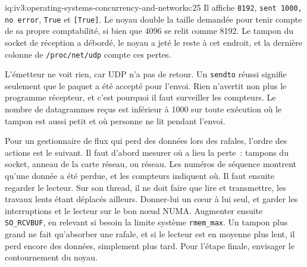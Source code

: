 \begin{solution}{iq:iv3:operating-systems-concurrency-and-networks:25}
Il affiche \texttt{8192}, \texttt{sent 1000, no error}, \texttt{True} et \texttt{[True]}. Le noyau double la taille demandée pour tenir compte de sa propre comptabilité, si bien que 4096 se relit comme 8192. Le tampon du socket de réception a débordé, le noyau a jeté le reste à cet endroit, et la dernière colonne de \texttt{/proc/net/udp} compte ces pertes.

L'émetteur ne voit rien, car UDP n'a pas de retour. Un \texttt{sendto} réussi signifie seulement que le paquet a été accepté pour l'envoi. Rien n'avertit non plus le programme récepteur, et c'est pourquoi il faut surveiller les compteurs. Le nombre de datagrammes reçus est inférieur à 1000 sur toute exécution où le tampon est aussi petit et où personne ne lit pendant l'envoi.

Pour un gestionnaire de flux qui perd des données lors des rafales, l'ordre des actions est le suivant. Il faut d'abord mesurer où a lieu la perte~: tampons du socket, anneau de la carte réseau, ou réseau. Les numéros de séquence montrent qu'une donnée a été perdue, et les compteurs indiquent où. Il faut ensuite regarder le lecteur. Sur son thread, il ne doit faire que lire et transmettre, les travaux lents étant déplacés ailleurs. Donner-lui un cœur à lui seul, et garder les interruptions et le lecteur sur le bon nœud NUMA. Augmenter ensuite \texttt{SO\_RCVBUF}, en relevant si besoin la limite système \texttt{rmem\_max}. Un tampon plus grand ne fait qu'absorber une rafale, et si le lecteur est en moyenne plus lent, il perd encore des données, simplement plus tard. Pour l'étape finale, envisager le contournement du noyau.

\end{solution}

